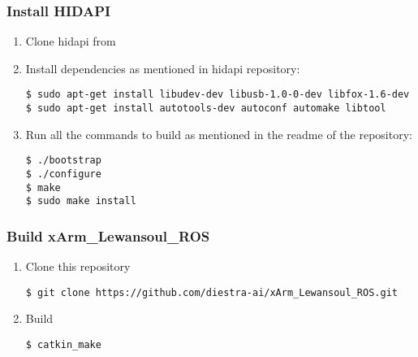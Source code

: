 \documentclass[letterpaper,10pt,english]{sphinxmanual}
\begin{document}
\subsubsection{Install HIDAPI}
\label{\detokenize{user_guide/1_1_introduction:install-hidapi}}\begin{enumerate}
%
\item {} 
\sphinxAtStartPar
Clone hidapi from  

\item {} 
\sphinxAtStartPar
Install dependencies as mentioned in hidapi repository:



\begin{Verbatim}[commandchars=\\\{\}]
$ sudo apt-get install libudev-dev libusb-1.0-0-dev libfox-1.6-dev
$ sudo apt-get install autotools-dev autoconf automake libtool
\end{Verbatim}

\item {} 
\sphinxAtStartPar
Run all the commands to build as mentioned in the readme of the repository:



\begin{Verbatim}[commandchars=\\\{\}]
$ ./bootstrap
$ ./configure
$ make
$ sudo make install
\end{Verbatim}

\end{enumerate}


\subsubsection{Build xArm\_Lewansoul\_ROS}
\label{\detokenize{user_guide/1_1_introduction:build-xarm-lewansoul-ros}}\begin{enumerate}
%
\item {} 
\sphinxAtStartPar
Clone this repository



\begin{Verbatim}[commandchars=\\\{\}]
$ git clone https://github.com/diestra-ai/xArm_Lewansoul_ROS.git
\end{Verbatim}

\item {} 
\sphinxAtStartPar
Build



\begin{Verbatim}[commandchars=\\\{\}]
$ catkin_make
\end{Verbatim}

\end{enumerate}
\end{document}
